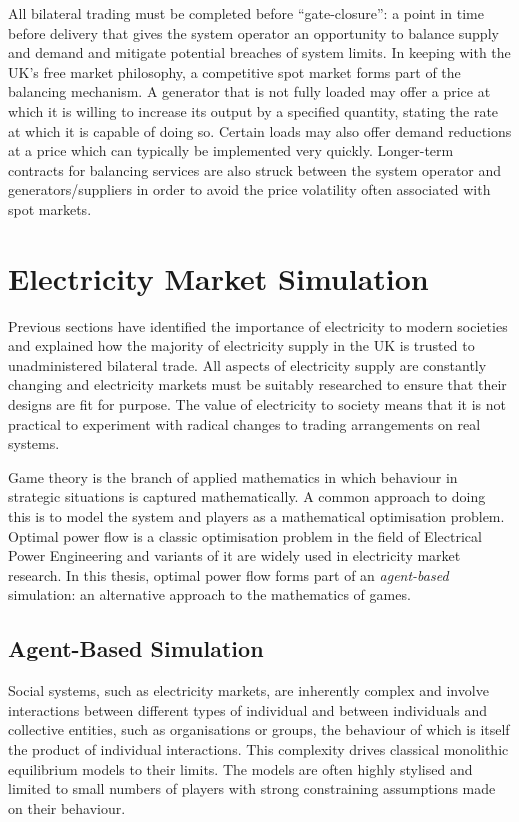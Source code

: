 All bilateral trading must be completed before ``gate-closure'': a point in time
before delivery that gives the system operator an opportunity to balance supply
and demand and mitigate potential breaches of system limits.  In keeping with
the UK's free market philosophy, a competitive spot market \cite{schweppe:spot}
forms part of the balancing mechanism.  A generator that is not fully loaded
may offer a price at which it is willing to increase its output by a specified
quantity, stating the rate at which it is capable of doing so.  Certain loads
may also offer demand reductions at a price which can typically be implemented
very quickly.  Longer-term contracts for balancing services are also struck
between the system operator and generators/suppliers in order to avoid the price
volatility often associated with spot markets.

\section{Electricity Market Simulation}
Previous sections have identified the importance of electricity to modern
societies and explained how the majority of electricity supply in the UK is
trusted to unadministered bilateral trade.  All aspects of electricity supply
are constantly changing and electricity markets must be suitably researched to
ensure that their designs are fit for purpose.  The value of electricity to
society means that it is not practical to experiment with radical changes to
trading arrangements on real systems.

Game theory is the branch of applied mathematics in which behaviour in strategic
situations is captured mathematically.  A common approach to doing this is to
model the system and players as a mathematical optimisation problem.  Optimal
power flow is a classic optimisation problem in the field of Electrical Power
Engineering and variants of it are widely used in electricity market research.
In this thesis, optimal power flow forms part of an \textit{agent-based}
simulation: an alternative approach to the mathematics of games.

\subsection{Agent-Based Simulation}
Social systems, such as electricity markets, are inherently complex and involve
interactions between different types of individual and between individuals and
collective entities, such as organisations or groups, the behaviour of which is
itself the product of individual interactions.  This complexity drives classical
monolithic equilibrium models to their limits.  The models are often highly
stylised and limited to small numbers of players with strong constraining
assumptions made on their behaviour.

